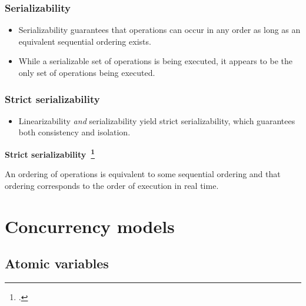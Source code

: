 \documentclass[aspectratio=1610]{beamer}
\begin{document}
  \begin{frame}
    \frametitle{Serializability}

    \begin{figure}
      \centering
      
    \end{figure}

    \vfill

    \begin{itemize}
      \item Serializability guarantees that operations can occur in any order as long as an equivalent sequential ordering exists.
      \item While a serializable set of operations is being executed, it appears to be the only set of operations being executed.
    \end{itemize}
  \end{frame}

  \begin{frame}
    \frametitle{Strict serializability}

    \begin{itemize}
      \item Linearizability \emph{and} serializability yield strict serializability, which guarantees both consistency and isolation.
    \end{itemize}

    \vfill

    \textbf{Strict serializability~\footcite{Herlihy1990}}

    An ordering of operations is equivalent to some sequential ordering and that ordering corresponds to the order of execution in real time.
  \end{frame}


  \section{Concurrency models}

  \subsection{Atomic variables}
\end{document}
